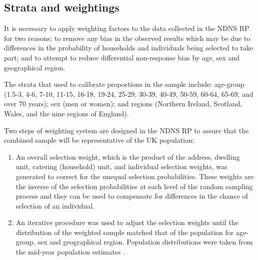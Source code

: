 \subsection{Strata and weightings}\vspace{-0.3cm}

It is necessary to apply weighting factors to the data collected in the NDNS RP for two reasons: to remove any bias in the observed results which may be due to differences in the probability of households and individuals being selected to take part; and to attempt to reduce differential non-response bias by age, sex and geographical region. 

The strata that used to calibrate proportions in the sample include: age-group (1.5-3, 4-6, 7-10, 11-15, 16-18, 19-24, 25-29, 30-39, 40-49, 50-59, 60-64, 65-69, and over 70 years); sex (men or women); and regions (Northern Ireland, Scotland, Wales, and the nine regions of England). 

Two steps of weighting system are designed in the NDNS RP to assure that the combined sample will be representative of the UK population: 

\begin{enumerate}
	\item An overall selection weight, which is the product of the address, dwelling unit, catering (household) unit, and individual selection weights, was generated to correct for the unequal selection probabilities. These weights are the inverse of the selection probabilities at each level of the random sampling process and they can be used to compensate for differences in the chance of selection of an individual.
	\item An iterative procedure was used to adjust the selection weights until the distribution of the weighted sample matched that of the population for age-group, sex and geographical region. Population distributions were taken from the mid-year population estimates \parencite{OfficeofNationalStat}. 
\end{enumerate}



